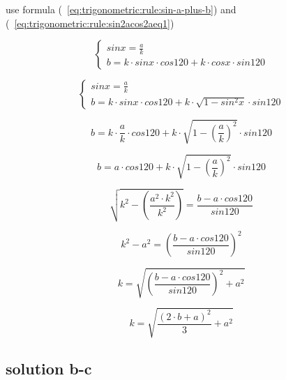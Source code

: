 \documentclass[unicode, 12pt, a4paper]{article}
\begin{document}
use formula (~\ref{eq:trigonometric:rule:sin-a-plus-b}) and (~\ref{eq:trigonometric:rule:sin2acos2aeq1})

\begin{equation}
  \begin{cases}
    sin x = \frac{a}{k}\\
    b = k \cdot sin x \cdot cos 120 + k \cdot cos x \cdot sin 120
  \end{cases}
\end{equation}


\begin{equation}
  \begin{cases}
    sin x = \frac{a}{k}\\
    b = k \cdot sin x \cdot cos 120 + k \cdot \sqrt{1 - sin^2 x} \cdot sin 120
  \end{cases}
\end{equation}


\begin{equation}
  b = k \cdot \frac{a}{k} \cdot cos 120 + k \cdot \sqrt{1 - \left(\frac{a}{k}\right)^2} \cdot sin 120
\end{equation}

\begin{equation}
  b = a \cdot cos 120 + k \cdot \sqrt{1 - \left(\frac{a}{k}\right)^2} \cdot sin 120
\end{equation}

\begin{equation}
  \sqrt{k^2 - \left(\frac{a^2 \cdot k^2}{k^2}\right)} =  \frac{b - a \cdot cos 120}{sin 120}
\end{equation}

\begin{equation}
  k^2 - a^2  =  \left(\frac{b - a \cdot cos 120}{sin 120}\right)^2
\end{equation}

\begin{equation}
  k = \sqrt{\left(\frac{b - a \cdot cos 120}{sin 120}\right)^2 + a^2}
\end{equation}

\begin{equation}
  k = \sqrt{\frac{(2 \cdot b + a)^2}{3} + a^2}
\end{equation}





\subsection{solution b-c}
\end{document}
